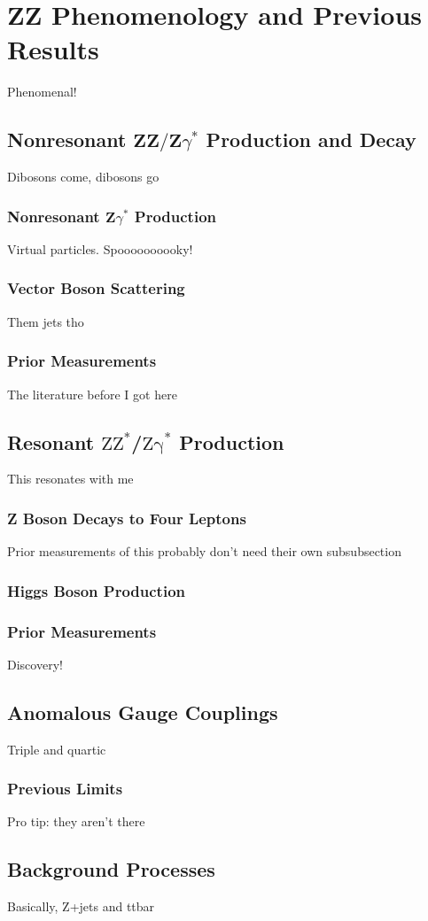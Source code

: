 
\chapter{ZZ Phenomenology and Previous Results}
Phenomenal!

\section{Nonresonant
         \texorpdfstring{$\mathbf{ZZ/Z}\gamma^\ast$}{ZZ/Zgamma*}
         Production and Decay}
Dibosons come, dibosons go

\subsection{Nonresonant
            \texorpdfstring{$\mathbf{Z}\gamma^\ast$}{Zgamma*}
            Production}
Virtual particles. Spoooooooooky!

\subsection{Vector Boson Scattering}
Them jets tho

\subsection{Prior Measurements}
The literature before I got here


\section{Resonant
         \texorpdfstring{$\mathrm{ZZ}^\ast$/$\mathrm{Z\gamma}^\ast$}
         {ZZ*/Zgamma*}
         Production
         }
This resonates with me

\subsection{Z Boson Decays to Four Leptons}
Prior measurements of this probably don't need their own subsubsection


\subsection{Higgs Boson Production}

\subsection{Prior Measurements}
Discovery!



\section{Anomalous Gauge Couplings}
Triple and quartic

\subsection{Previous Limits}
Pro tip: they aren't there



\section{Background Processes}
Basically, Z+jets and ttbar
